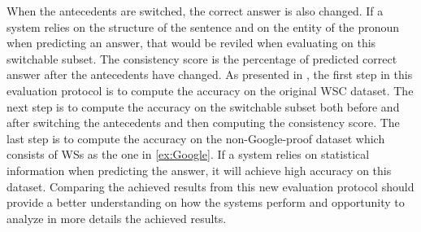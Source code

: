When the antecedents are switched, the correct answer is also changed. If a system relies on the structure of the sentence and on the entity of the pronoun when predicting an answer, that would be reviled when evaluating on this switchable subset.
The consistency score is the percentage of predicted correct answer after the antecedents have changed. 
As presented in \cite{DBLP:journals/corr/abs-1811-01778}, the first step in this evaluation protocol is to compute the accuracy on the original WSC dataset. The next step is to compute the accuracy on the switchable subset both before and after switching the antecedents and then computing the consistency score. The last step is to compute the accuracy on the non-Google-proof dataset which consists of WSs as the one in \ref{ex:Google}. If a system relies on statistical information when predicting the answer, it will achieve high accuracy on this dataset. 
Comparing the achieved results from this new evaluation protocol should provide a better understanding on how the systems perform and opportunity to analyze in more details the achieved results. 



